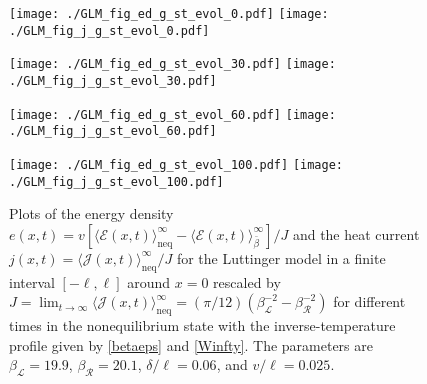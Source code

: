\documentclass[12pt,a4paper]{article}
\newcommand{\cE}{\mathcal{E}}
\newcommand{\cJ}{\mathcal{J}}
\newcommand{\cL}{\mathcal{L}}
\newcommand{\cR}{\mathcal{R}}
\theoremstyle{definition}
\theoremstyle{remark}
\begin{document}
\begin{figure}[!t]
\centering
\texttt{[image: ./GLM\_fig\_ed\_g\_st\_evol\_0.pdf]}
\hfill
\texttt{[image: ./GLM\_fig\_j\_g\_st\_evol\_0.pdf]}

\centering
\texttt{[image: ./GLM\_fig\_ed\_g\_st\_evol\_30.pdf]}
\hfill
\texttt{[image: ./GLM\_fig\_j\_g\_st\_evol\_30.pdf]}

\centering
\texttt{[image: ./GLM\_fig\_ed\_g\_st\_evol\_60.pdf]}
\hfill
\texttt{[image: ./GLM\_fig\_j\_g\_st\_evol\_60.pdf]}

\centering
\texttt{[image: ./GLM\_fig\_ed\_g\_st\_evol\_100.pdf]}
\hfill
\texttt{[image: ./GLM\_fig\_j\_g\_st\_evol\_100.pdf]}

\caption{Plots of the energy density $e(x,t) = v[\langle\cE(x,t) \rangle^\infty_{\text{neq}} -\langle\cE(x,t)\rangle^\infty_{\bar\beta}]/J$ and the heat current
$j(x,t) = \langle\cJ(x,t)\rangle^\infty_{\text{neq}}/J$ for the Luttinger model
in a finite interval $[-\ell,\ell]$ around $x = 0$ rescaled by
$J = \lim_{t \to \infty}\langle\cJ(x,t)\rangle^\infty_{\text{neq}} = ({\pi}/{12})
\left( \beta_{\cL}^{-2} - \beta_{\cR}^{-2} \right)$ for different times in
the nonequilibrium state with the inverse-temperature profile given by
\eqref{betaeps} and \eqref{Winfty}. The parameters are $\beta_{\cL} = 19.9$,
$\beta_{\cR}=20.1$, $\delta/\ell = 0.06$, and $v/\ell=0.025$.}
\label{Fig:Evolution_Luttinger}
\vskip 0.2cm
\end{figure}
%
\end{document}
